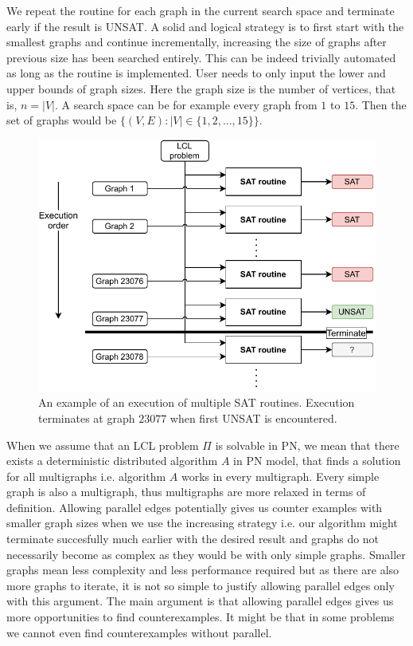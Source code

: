 We repeat the routine for each graph in the current search space and terminate early if the result is UNSAT.
A solid and logical strategy is to first start with the smallest graphs and continue incrementally, increasing the size of graphs  after previous size has been searched entirely.
This can be indeed trivially automated as long as the routine is implemented.
User needs to only input the lower and upper bounds of graph sizes.
Here the graph size is the number of vertices, that is, $n=|V|$.
A search space can be for example every graph from $1$ to $15$.
Then the set of graphs would be $\{(V, E) : |V| \in \{1, 2, ..., 15\} \}$.

\begin{figure}[h]
\centering
\includegraphics[]{diagrams/implementation_idea_diagram3.pdf}
\caption{An example of an execution of multiple SAT routines. Execution terminates at graph $23077$ when first UNSAT is encountered.}
\label{fig:implementatio:idea:2}
\end{figure}


When we assume that an LCL problem $\Pi$ is solvable in PN, we mean that there exists a deterministic distributed algorithm $A$ in PN model, that finds a solution for all multigraphs i.e. algorithm $A$ works in every multigraph.
Every simple graph is also a multigraph, thus multigraphs are more relaxed in terms of definition.
Allowing parallel edges potentially gives us counter examples with smaller graph sizes when we use the increasing strategy i.e. our algorithm might terminate succesfully much earlier with the desired result and graphs do not necessarily become as complex as they would be with only simple graphs.
Smaller graphs mean less complexity and less performance required but as there are also more graphs to iterate, it is not so simple to justify allowing parallel edges only with this argument.
The main argument is that allowing parallel edges gives us more opportunities to find counterexamples.
It might be that in some problems we cannot even find counterexamples without parallel.

